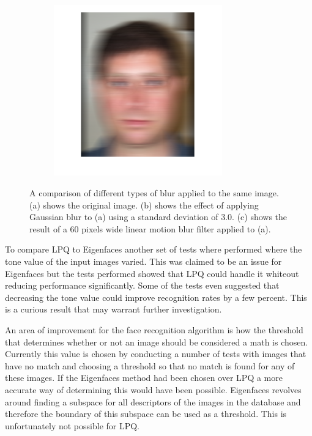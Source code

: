 \begin{figure}[H]
\begin{subfigure}{.30\textwidth}
  \includegraphics[width=0.8\textwidth]{img/blur_test/motion_img.png}
  \caption{}
\end{subfigure}%
\caption{A comparison of different types of blur applied to the same image. (a) shows the original image. (b) shows the effect of applying Gaussian blur to (a) using a standard deviation of 3.0. (c) shows the result of a 60 pixels wide linear motion blur filter applied to (a).}
\label{fig:fr_result_images}
\end{figure}

To compare LPQ to Eigenfaces another set of tests where performed where the tone value of the input images varied. This was claimed to be an issue for Eigenfaces but the tests performed showed that LPQ could handle it whiteout reducing performance significantly. Some of the tests even suggested that decreasing the tone value could improve recognition rates by a few percent. This is a curious result that may warrant further investigation.

An area of improvement for the face recognition algorithm is how the threshold that determines whether or not an image should be considered a math is chosen. Currently this value is chosen by conducting a number of tests with images that have no match and choosing a threshold so that no match is found for any of these images. If the Eigenfaces method had been chosen over LPQ a more accurate way of determining this would have been possible. Eigenfaces revolves around finding a subspace for all descriptors of the images in the database and therefore the boundary of this subspace can be used as a threshold. This is unfortunately not possible for LPQ.
